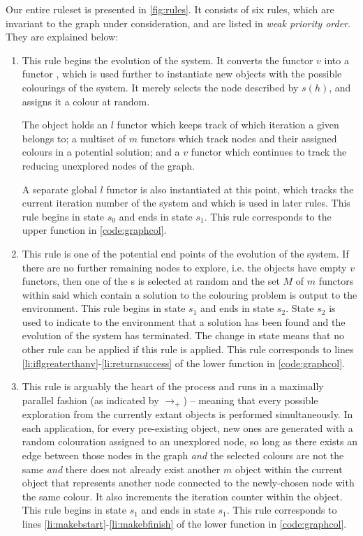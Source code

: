 Our entire ruleset is presented in \autoref{fig:rules}.  It consists of six rules, which are invariant to the graph under consideration, and are listed in \emph{weak priority order}.  They are explained below:

\begin{enumerate}
\item This rule begins the evolution of the system.  It converts the functor \(v\) into a functor \bo{}, which is used further to instantiate new objects with the possible colourings of the system.  It merely selects the node described by \(s(h)\), and assigns it a colour at random.

The \bo{} object holds an \(l\) functor which keeps track of which iteration a given \bo{} belongs to; a multiset of \(m\) functors which track nodes and their assigned colours in a potential solution; and a \(v\) functor which continues to track the reducing unexplored nodes of the graph.

A separate global \(l\) functor is also instantiated at this point, which tracks the current iteration number of the system and which is used in later rules.  This rule begins in state \(s_0\) and ends in state \(s_1\).  This rule corresponds to the upper  function in \autoref{code:graphcol}.

\item This rule is one of the potential end points of the evolution of the system.  If there are no further remaining nodes to explore, i.e. the \bo{} objects have empty \(v\) functors, then one of the \bo{}s is selected at random and the set \(M\) of \(m\) functors within said \bo{} which contain a solution to the colouring problem is output to the environment.  This rule begins in state \(s_1\) and ends in state \(s_2\).  State \(s_2\) is used to indicate to the environment that a solution has been found and the evolution of the system has terminated.  The change in state means that no other rule can be applied if this rule is applied.  This rule corresponds to lines \ref{li:iflgreaterthanv}-\ref{li:returnsuccess} of the lower  function in \autoref{code:graphcol}.

\item This rule is arguably the heart of the process and runs in a maximally parallel fashion (as indicated by \(\rightarrow_+\)) -- meaning that every possible exploration from the currently extant \bo{} objects is performed simultaneously.  In each application, for every pre-existing \bo{} object, new ones are generated with a random colouration assigned to an unexplored node, so long as there exists an edge between those nodes in the graph \emph{and} the selected colours are not the same \emph{and} there does not already exist another \(m\) object within the current \bo{} object that represents another node connected to the newly-chosen node with the same colour.  It also increments the iteration counter within the \bo{} object.  This rule begins in state \(s_1\) and ends in state \(s_1\).  This rule corresponds to lines \ref{li:makebstart}-\ref{li:makebfinish} of the lower  function in \autoref{code:graphcol}.


\end{enumerate}
